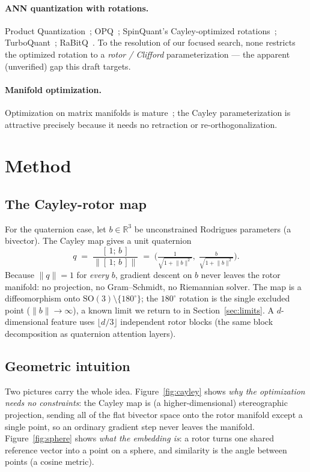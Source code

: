 \documentclass[11pt]{article}
\begin{document}
\paragraph{ANN quantization with rotations.} Product
Quantization~\cite{jegou2011pq}; OPQ~\cite{ge2013opq}; SpinQuant's Cayley-optimized
rotations~\cite{liu2024spinquant}; TurboQuant~\cite{zandieh2025turboquant};
RaBitQ~\cite{gao2024rabitq}. To the resolution of our focused search, none
restricts the optimized rotation to a \emph{rotor / Clifford} parameterization ---
the apparent (unverified) gap this draft targets.

\paragraph{Manifold optimization.} Optimization on matrix manifolds is
mature~\cite{absil2008optim}; the Cayley parameterization is attractive precisely
because it needs no retraction or re-orthogonalization.

\section{Method}
\label{sec:method}

\subsection{The Cayley-rotor map}
\label{sec:method-map}
For the quaternion case, let $b\in\mathbb{R}^3$ be unconstrained Rodrigues
parameters (a bivector). The Cayley map gives a unit quaternion
\[
  q \;=\; \frac{[\,1;\,b\,]}{\lVert [\,1;\,b\,] \rVert}
        \;=\; \Big(\tfrac{1}{\sqrt{1+\lVert b\rVert^2}},\;
                   \tfrac{b}{\sqrt{1+\lVert b\rVert^2}}\Big).
\]
Because $\lVert q\rVert = 1$ for \emph{every} $b$, gradient descent on $b$ never
leaves the rotor manifold: no projection, no Gram--Schmidt, no Riemannian solver.
The map is a diffeomorphism onto $\mathrm{SO}(3)\setminus\{180^\circ\}$; the
$180^\circ$ rotation is the single excluded point ($\lVert b\rVert\to\infty$), a
known limit we return to in Section~\ref{sec:limits}. A $d$-dimensional feature
uses $\lfloor d/3\rfloor$ independent rotor blocks (the same block decomposition as
quaternion attention layers).

\subsection{Geometric intuition}
\label{sec:geom}
Two pictures carry the whole idea. Figure~\ref{fig:cayley} shows \emph{why the
optimization needs no constraints}: the Cayley map is (a higher-dimensional)
stereographic projection, sending all of the flat bivector space onto the rotor
manifold except a single point, so an ordinary gradient step never leaves the
manifold. Figure~\ref{fig:sphere} shows \emph{what the embedding is}: a rotor
turns one shared reference vector into a point on a sphere, and similarity is the
angle between points (a cosine metric).
\end{document}

